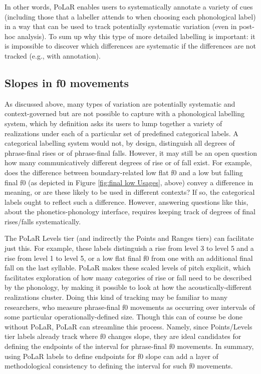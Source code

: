 \documentclass[11pt, twoside]{memoir}
\begin{document}
In other words, PoLaR enables users to systematically annotate a variety of cues (including those that a labeller attends to when choosing each phonological label) in a way that can be used to track potentially systematic variation (even in post-hoc analysis). To sum up why this type of more detailed labelling is important: it is impossible to discover which differences are systematic if the differences are not tracked (e.g., with annotation).


\subsection{Slopes in f0 movements}\label{sec:pitch-slopes}
As discussed above, many types of variation are potentially systematic and context-governed but are not possible to capture with a phonological labelling system, which by definition asks its users to lump together a variety of realizations under each of a particular set of predefined categorical labels. A categorical labelling system would not, by design, distinguish all degrees of phrase-final rises or of phrase-final falls. However, it may still be an open question how many communicatively different degrees of rise or of fall exist. For example, does the difference between boundary-related low flat f0 and a low but falling final f0 (as depicted in Figure \ref{fig:final low Usages}, above) convey a difference in meaning, or are these likely to be used in different contexts? If so, the categorical labels ought to reflect such a difference. However, answering questions like this, about the phonetics-phonology interface, requires keeping track of degrees of final rises\slash falls systematically.

The PoLaR Levels tier (and indirectly the Points and Ranges tiers) can facilitate just this. For example, these labels distinguish a rise from level 3 to level 5 and a rise from level 1 to level 5, or a low flat final f0 from one with an additional final fall on the last syllable. PoLaR makes these scaled levels of pitch explicit, which facilitates exploration of how many categories of rise or fall need to be described by the phonology, by making it possible to look at how the acoustically-different realizations cluster. Doing this kind of tracking may be familiar to many researchers, who measure phrase-final f0 movements as occurring over intervals of some particular operationally-defined size. Though this can of course be done without PoLaR, PoLaR can streamline this process. Namely, since Points\slash Levels tier labels already track where f0 changes slope, they are ideal candidates for defining the endpoints of the interval for phrase-final f0 movements. In summary, using PoLaR labels to define endpoints for f0 slope can add a layer of methodological consistency to defining the interval for such f0 movements.
\end{document}
